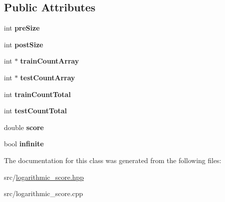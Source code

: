 \subsection*{Public Attributes}
\begin{DoxyCompactItemize}
\item 
\hypertarget{classLogarithmicScoreValue_a553cdae1ae69f229316b73a360589776}{int {\bfseries pre\-Size}}\label{classLogarithmicScoreValue_a553cdae1ae69f229316b73a360589776}

\item 
\hypertarget{classLogarithmicScoreValue_a8b15f92de2d4e003b4a3826c7817b2f8}{int {\bfseries post\-Size}}\label{classLogarithmicScoreValue_a8b15f92de2d4e003b4a3826c7817b2f8}

\item 
\hypertarget{classLogarithmicScoreValue_a7faf693e6b53450f8bdf3d9b8c2bda9b}{int $\ast$ {\bfseries train\-Count\-Array}}\label{classLogarithmicScoreValue_a7faf693e6b53450f8bdf3d9b8c2bda9b}

\item 
\hypertarget{classLogarithmicScoreValue_a3cd25470e851035b0b953ab19d3416e6}{int $\ast$ {\bfseries test\-Count\-Array}}\label{classLogarithmicScoreValue_a3cd25470e851035b0b953ab19d3416e6}

\item 
\hypertarget{classLogarithmicScoreValue_a5bee04d8401da678ac83f77efd0c6e4a}{int {\bfseries train\-Count\-Total}}\label{classLogarithmicScoreValue_a5bee04d8401da678ac83f77efd0c6e4a}

\item 
\hypertarget{classLogarithmicScoreValue_a4a6de49414afc11d8505313d385f8552}{int {\bfseries test\-Count\-Total}}\label{classLogarithmicScoreValue_a4a6de49414afc11d8505313d385f8552}

\item 
\hypertarget{classLogarithmicScoreValue_aaeac28c5557929803745879f6a1e65d7}{double {\bfseries score}}\label{classLogarithmicScoreValue_aaeac28c5557929803745879f6a1e65d7}

\item 
\hypertarget{classLogarithmicScoreValue_a1cc8b1248437817c7c8055bd0e8d0161}{bool {\bfseries infinite}}\label{classLogarithmicScoreValue_a1cc8b1248437817c7c8055bd0e8d0161}

\end{DoxyCompactItemize}


The documentation for this class was generated from the following files\-:\begin{DoxyCompactItemize}
\item 
src/\hyperlink{logarithmic__score_8hpp}{logarithmic\-\_\-score.\-hpp}\item 
src/logarithmic\-\_\-score.\-cpp\end{DoxyCompactItemize}
